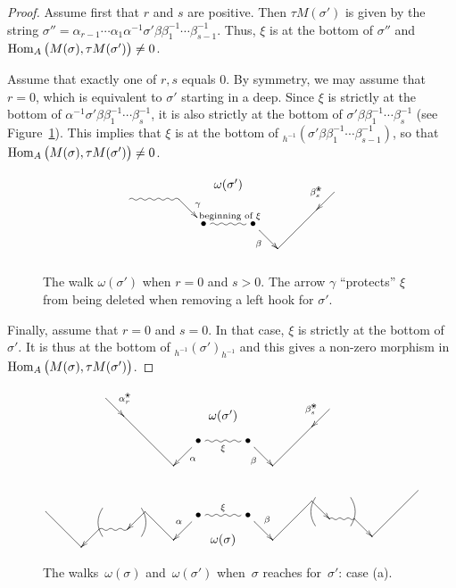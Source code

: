 \documentclass{amsart}
\theoremstyle{definition}
\newcommand{\blossom}{^\text{\ding{96}}} %
\newcommand{\Hom}[1]{\operatorname{{\rm Hom}}_{#1}}
\begin{document}
\begin{proof}
Assume first that $r$ and $s$ are positive.
Then $\tau M(\sigma')$ is given by the string $\sigma''=\alpha_{r-1} \cdots \alpha_1 \alpha^{-1} \sigma' \beta \beta_1^{-1} \cdots \beta_{s-1}^{-1}$.
Thus, $\xi$ is at the bottom of $\sigma''$ and $\Hom{A} \big( M(\sigma), \tau M(\sigma') \big) \neq 0$.

Assume that exactly one of $r,s$ equals $0$.
By symmetry, we may assume that $r=0$, which is equivalent to $\sigma'$ starting in a deep.
Since $\xi$ is strictly at the bottom of $\alpha^{-1}\sigma'\beta\beta_1^{-1}\cdots\beta_s^{-1}$, it is also strictly at the bottom of $\sigma'\beta\beta_1^{-1}\cdots\beta_s^{-1}$ (see Figure~\ref{fig: r=0}).
This implies that $\xi$ is at the bottom of $_{h^{-1}}(\sigma'\beta\beta_1^{-1}\cdots\beta_{s-1}^{-1})$, so that $\Hom{A} \big( M(\sigma), \tau M(\sigma') \big) \ne 0$.

\begin{figure}[h]
 	\capstart
\[
\xy
%
(-33,16)="-14";
(-28,21)="-13";
(-14,21)="-12";
(-7,14)*+{\bullet}="-11";
(0,25)*+{\omega(\sigma')};
(7,14)*+{\bullet}="11";
(14,7)="12";
(25,18)="13";
(30,23)="14";
%
{\ar@{~} "-13";"-12"};
{\ar^{\gamma} "-12";"-11"};
{\ar@{~}^{\text{ beginning of }\xi} "-11";"11"};
{\ar_\beta "11";"12"};
{\ar@{-} "12";"13"};
{\ar_{\beta_s\blossom} "14";"13"};
%
\endxy
\]
    \caption{The walk $\omega(\sigma')$ when $r=0$ and $s>0$. The arrow $\gamma$ ``protects'' $\xi$ from being deleted when removing a left hook for $\sigma'$.}
    \label{fig: r=0}
\end{figure}

Finally, assume that $r=0$ and $s=0$.
In that case, $\xi$ is strictly at the bottom of $\sigma'$.
It is thus at the bottom of $_{h^{-1}}(\sigma')_{h^{-1}}$ and this gives a non-zero morphism in $\Hom{A} \big( M(\sigma), \tau M(\sigma') \big)$.
\end{proof}

\begin{figure}[p]
\[
\xy
%
(-33,26)="-14";
(-28,21)="-13";
(-14,7)="-12";
(-7,14)*+{\bullet}="-11";
(0,21)*+{\omega(\sigma')};
(7,14)*+{\bullet}="11";
(14,7)="12";
(25,18)="13";
(30,23)="14";
%
{\ar^{\alpha_r\blossom} "-14";"-13"};
{\ar@{-} "-13";"-12"};
{\ar^\alpha "-11";"-12"};
{\ar@{~}_\xi "-11";"11"};
{\ar_\beta "11";"12"};
{\ar@{-} "12";"13"};
{\ar_{\beta_s\blossom} "14";"13"};
%
%
(-50,-6)="-7";
(-40,-16)="-6";
(-35,-11)="-5";
(-27,-11)="-4";
(-22,-6)="-3";
(-14,-14)="-2";
(-7,-7)*+{\bullet}="-1";
(0,-14)*+{\omega(\sigma)};
(7,-7)*+{\bullet}="1";
(14,-14)="2";
(25,-3)="3";
(30,-8)="4";
(37,-8)="5";
(42,-13)="6";
(55,0)="7";
%
{\ar@{-} "-7";"-6"};
{\ar "-5";"-6"};
{\ar@{~} "-5";"-4"};
{\ar "-3";"-4"};
{\ar@{-} "-3";"-2"};
{\ar_\alpha "-1";"-2"};
{\ar@{~}^\xi "-1";"1"};
{\ar^\beta "1";"2"};
{\ar@{-} "2";"3"};
{\ar "3";"4"};
{\ar@{~} "4";"5"};
{\ar "5";"6"};
{\ar@{-} "6";"7"};
%
{\ar@/^.3pc/@{-} (-23,-5);(-23,-13)};
{\ar@/_.3pc/@{-} (-34,-5);(-34,-13)};
%
{\ar@/_.3pc/@{-} (26,-2);(26,-10)};
{\ar@/^.3pc/@{-} (36,-2);(36,-10)};
%
\endxy
\]
    \caption{The walks~$\omega(\sigma)$ and~$\omega(\sigma')$ when~$\sigma$ reaches for~$\sigma'$: case (a).}
    \vspace{1cm}
    \label{fig: dance case a}
\end{figure}
\end{document}
